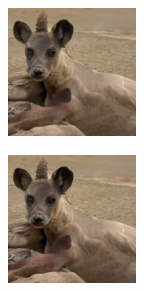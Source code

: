 \documentclass{article}
\begin{document}
\begin{figure}
\begin{subfigure}[b]{0.5\linewidth}
\begin{subfigure}[b]{0.242\linewidth}
        \end{subfigure}%
        \begin{subfigure}[b]{0.242\linewidth}
        \includegraphics[width=\linewidth]{figures/imagenet128/solver_samples/imagenet128_fm_ot_330_20.png}
        \end{subfigure}%
        \begin{subfigure}[b]{0.242\linewidth}
        \includegraphics[width=\linewidth]{figures/imagenet128/solver_samples/imagenet128_fm_ot_330_50.png}

\end{subfigure}
\end{subfigure}
\end{figure}
\end{document}
